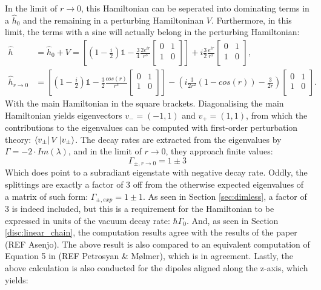 \documentclass{article}
\begin{document}
In the limit of $r\rightarrow 0$, this Hamiltonian can be seperated into dominating terms in a $\hat{h}_0$ and the remaining in a perturbing Hamiltoninan $V$. Furthermore, in this limit, the terms with a sine will actually belong in the perturbing Hamiltonian:
\begin{equation}\label{eq:pertubation}
    \begin{split}
        \hat{h} &= \hat{h}_0 + V = \left[ \left( 1 - \frac{i}{2} \right) \mathds{1} - \frac{3}{4} \frac{2e^{ir}}{r^3} \begin{bmatrix} 0 & 1 \\ 1 & 0 \\ \end{bmatrix} \right] + i \frac{3}{2} \frac{e^{ir}}{r^2} \begin{bmatrix} 0 & 1 \\ 1 & 0 \\ \end{bmatrix}, \\
        \hat{h}_{r\rightarrow 0} &= \left[ \left( 1 - \frac{i}{2} \right) \mathds{1} - \frac{3}{2} \frac{cos(r)}{r^3} \begin{bmatrix} 0 & 1 \\ 1 & 0 \\ \end{bmatrix} \right] - \left( i \frac{3}{2r^2} \left(1 - cos(r)\right) - \frac{3}{2r} \right) \begin{bmatrix} 0 & 1 \\ 1 & 0 \\ \end{bmatrix}.
    \end{split}
\end{equation}
With the main Hamiltonian in the square brackets. Diagonalising the main Hamiltonian yields eigenvectors $v_- = (-1, 1)$ and $v_+ = (1, 1)$, from which the contributions to the eigenvalues can be computed with first-order perturbation theory: $\bra{v_{\pm}} V \ket{v_{\pm}}$. The decay rates are extracted from the eigenvalues by $\Gamma = -2 \cdot Im(\lambda)$, and in the limit of $r\rightarrow 0$, they approach finite values:
\begin{equation}\label{eq:N2_decayrates_ex}
    \Gamma_{\pm,r\rightarrow 0} = 1 \pm 3
\end{equation}
Which does point to a subradiant eigenstate with negative decay rate. Oddly, the splittings are exactly a factor of 3 off from the otherwise expected eigenvalues of a matrix of such form: $\Gamma_{\pm, exp} = 1 \pm 1$. As seen in Section \ref{sec:dimless}, a factor of 3 is indeed included, but this is a requirement for the Hamiltonian to be expressed in units of the vacuum decay rate: $\hbar \Gamma_0$. And, as seen in Section \ref{disc:linear_chain}, the computation results agree with the results of the paper (REF Asenjo). The above result is also compared to an equivalent computation of Equation 5 in (REF Petrosyan \& Mølmer), which is in agreement. Lastly, the above calculation is also conducted for the dipoles aligned along the z-axis, which yields:
\end{document}
